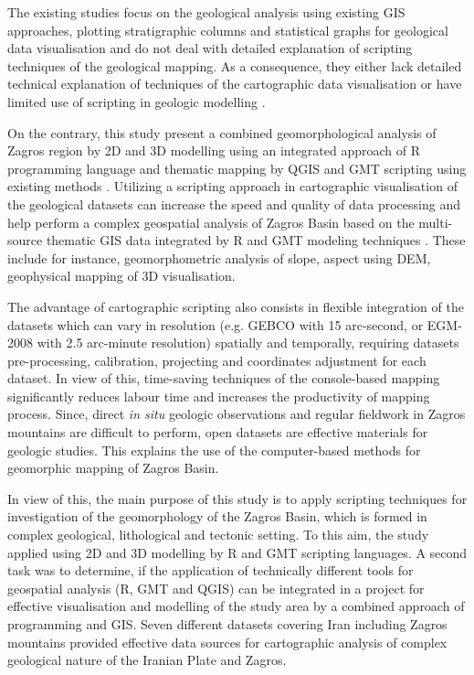 \documentclass[12pt,a4paper,oneside]{article}
\def \newpar{\vspace{6pt}}
\begin{document}
\newpar The existing studies focus on the geological analysis using existing GIS approaches, plotting stratigraphic columns and statistical graphs for geological data visualisation \citep{Mouthereau,Koshnaw,Suetova} and do not deal with detailed explanation of scripting techniques of the geological mapping. As a consequence, they either lack detailed technical explanation of techniques of the cartographic data visualisation \citep{Tavani} or have limited use of scripting in geologic modelling \citep{Lemenkov2021}. 

\newpar On the contrary, this study present a combined geomorphological analysis of Zagros region by 2D and 3D modelling using an integrated approach of R programming language and thematic mapping by QGIS and GMT scripting using existing methods \citep{Lemenkova202203}. Utilizing a scripting approach in cartographic visualisation of the geological datasets can increase the speed and quality of data processing and help perform a complex geospatial analysis of Zagros Basin based on the multi-source thematic GIS data integrated by R and GMT modeling techniques \citep{Lemenkova2019a}. These include for instance, geomorphometric analysis of slope, aspect using DEM, geophysical mapping of 3D visualisation. 

\newpar The advantage of cartographic scripting also consists in flexible integration of the datasets which can vary in resolution (e.g. GEBCO with 15 arc-second, or EGM-2008 with 2.5 arc-minute resolution) spatially and temporally, requiring datasets pre-processing, calibration, projecting and coordinates adjustment for each dataset. In view of this, time-saving techniques of the console-based mapping significantly reduces labour time and increases the productivity of mapping process.  Since, direct \emph{in situ} geologic observations and regular fieldwork in Zagros mountains are difficult to perform, open datasets are effective materials for geologic studies. This explains the use of the computer-based methods for geomorphic mapping of Zagros Basin. 

\newpar In view of this, the main purpose of this study is to apply scripting techniques for investigation of the geomorphology of the Zagros Basin, which is formed in complex geological, lithological and tectonic setting. To this aim, the study applied using 2D and 3D modelling by R and GMT scripting languages. A second task was to determine, if the application of technically different tools for geospatial analysis (R, GMT and QGIS) can be integrated in a project for effective visualisation and modelling of the study area by a combined approach of programming and GIS. Seven different datasets covering Iran including Zagros mountains provided effective data sources for cartographic analysis of complex geological nature of the Iranian Plate and Zagros. 
\end{document}
